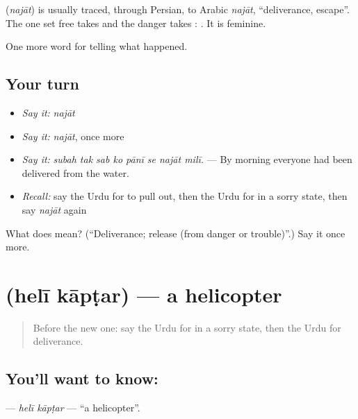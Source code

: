 \begin{cousinweb}
\textbf{} (\emph{najāt}) is usually traced, through Persian, to Arabic \emph{najāt}, \textquotedblleft{}deliverance, escape\textquotedblright{}. The one set free takes \textbf{} and the danger takes \textbf{}: \textbf{   }. It is feminine.
\end{cousinweb}

\begin{grammarlens}[title={What you've built}]
One more word for telling what happened.
\end{grammarlens}

\subsection*{Your turn}
\begin{itemize}
\raggedright
  \item \emph{Say it:} \emph{najāt}
  \item \emph{Say it:} \emph{najāt}, once more
  \item \emph{Say it:} \emph{subah tak sab ko pānī se najāt milī.} — By morning everyone had been delivered from the water.
  \item \emph{Recall:} say the Urdu for to pull out, then the Urdu for in a sorry state, then say \emph{najāt} again
\end{itemize}

\begin{tcolorbox}[breakable,colback=teal!4,colframe=teal!35!black,title={Before you move on}]
What does  mean? (\textquotedblleft{}Deliverance; release (from danger or trouble)\textquotedblright{}.) Say it once more.
\end{tcolorbox}
\section[\texorpdfstring{\ur{ہیلی} \ur{کاپٹر} (helī kāpṭar)}{ہیلی کاپٹر (helī kāpṭar)}]{  (helī kāpṭar) — a helicopter}

\label{lesson:UR-C296-heli-kaptar}



\begin{quote}
Before the new one: say the Urdu for in a sorry state, then the Urdu for deliverance.
\end{quote}

\subsection*{You'll want to know:  }
\textbf{ } — \emph{helī kāpṭar} — \textquotedblleft{}a helicopter\textquotedblright{}.

